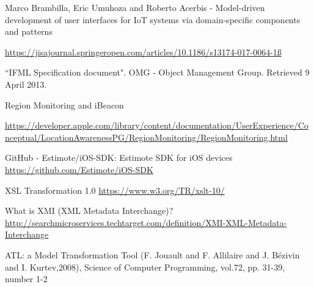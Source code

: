 

\begin{thebibliography}{90}

Marco Brambilla, Eric Umuhoza and Roberto Acerbis - Model-driven development of user interfaces for IoT systems via domain-specific components and patterns

\url{https://jisajournal.springeropen.com/articles/10.1186/s13174-017-0064-1ß}
    
``IFML Specification document". OMG - Object Management Group. Retrieved 9 April 2013.

Region Monitoring and iBeacon

\url{https://developer.apple.com/library/content/documentation/UserExperience/Conceptual/LocationAwarenessPG/RegionMonitoring/RegionMonitoring.html}
    
GitHub - Estimote/iOS-SDK: Estimote SDK for iOS devices
\url{https://github.com/Estimote/iOS-SDK}

XSL Transformation 1.0 
\url{https://www.w3.org/TR/xslt-10/}

What is XMI (XML Metadata Interchange)?
\url{http://searchmicroservices.techtarget.com/definition/XMI-XML-Metadata-Interchange}

ATL: a Model Transformation Tool (F. Jouault and F. Allilaire and J. B{\'e}zivin and I. Kurtev,2008), Science of Computer Programming, vol.72, pp. 31-39, number 1-2
\end{thebibliography}


